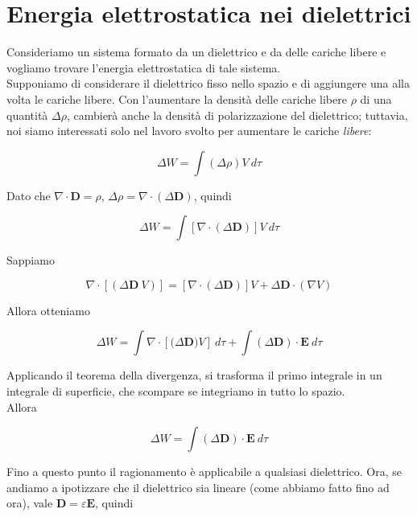 \section{Energia elettrostatica nei dielettrici}

Consideriamo un sistema formato da un dielettrico e da delle cariche libere e vogliamo trovare l'energia elettrostatica di tale sistema. \\

Supponiamo di considerare il dielettrico fisso nello spazio e di aggiungere una alla volta le cariche libere. Con l'aumentare la densità delle cariche libere $\rho$ di una quantità $\Delta \rho$, cambierà anche la densità di polarizzazione del dielettrico; tuttavia, noi siamo interessati solo nel lavoro svolto per aumentare le cariche \emph{libere}:

\begin{equation}
    \Delta W  = \int (\Delta \rho) V \ d \tau
\end{equation}

Dato che $\nabla \cdot \mathbf{D} = \rho $, $\Delta \rho = \nabla \cdot (\Delta \mathbf{D})$, quindi 

\begin{equation*}
    \Delta W = \int [\nabla \cdot (\Delta \mathbf{D})] V \ d \tau
\end{equation*}


Sappiamo 

\begin{equation*}
    \nabla \cdot [(\Delta \mathbf{D} \ V)] = [\nabla \cdot (\Delta \mathbf{D})] V + \Delta \mathbf{D} \cdot (\nabla V)
\end{equation*}

Allora otteniamo 

\begin{equation*}
    \Delta W = \int \nabla \cdot [(\Delta \mathbf{D)} V ] \ d \tau + \int (\Delta \mathbf{D}) \cdot \mathbf{E} \ d \tau
\end{equation*}

Applicando il teorema della divergenza, si trasforma il primo integrale in un integrale di superficie, che scompare se integriamo in tutto lo spazio. \\

Allora 

\begin{equation*}
    \Delta W = \int (\Delta \mathbf{D}) \cdot \mathbf{E} \ d \tau
\end{equation*}

Fino a questo punto il ragionamento è applicabile a qualsiasi dielettrico. Ora, se andiamo a ipotizzare che il dielettrico sia lineare (come abbiamo fatto fino ad ora), vale $\mathbf{D} = \varepsilon \mathbf{E}$, quindi 

